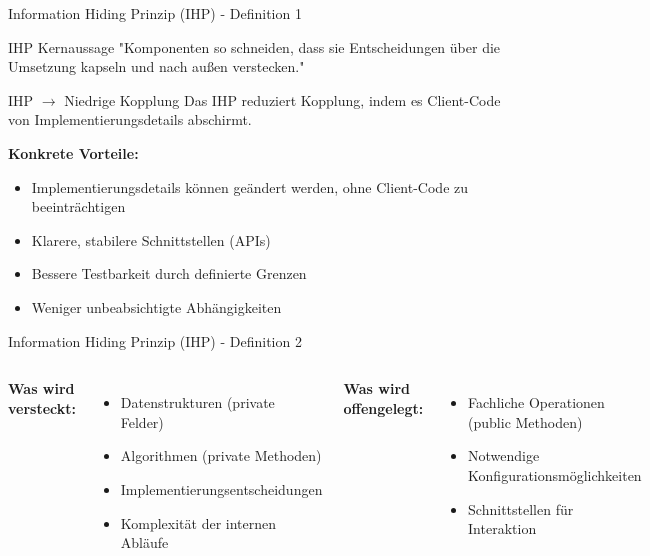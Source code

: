\begin{frame}{Information Hiding Prinzip (IHP) - Definition 1}
  \begin{exampleblock}{IHP Kernaussage}
    "Komponenten so schneiden, dass sie Entscheidungen über die Umsetzung kapseln und nach außen verstecken."
  \end{exampleblock}

  \begin{alertblock}{IHP $\rightarrow$ Niedrige Kopplung}
    Das IHP reduziert Kopplung, indem es Client-Code von Implementierungsdetails abschirmt.
  \end{alertblock}

  \textbf{Konkrete Vorteile:}
  \begin{itemize}
    \item Implementierungsdetails können geändert werden, ohne Client-Code zu beeinträchtigen
    \item Klarere, stabilere Schnittstellen (APIs)
    \item Bessere Testbarkeit durch definierte Grenzen
    \item Weniger unbeabsichtigte Abhängigkeiten
  \end{itemize}
\end{frame}

\begin{frame}{Information Hiding Prinzip (IHP) - Definition 2}
  \begin{columns}[T]
    \textbf{Was wird versteckt:}
    \begin{itemize}
      \item Datenstrukturen (private Felder)
      \item Algorithmen (private Methoden)
      \item Implementierungsentscheidungen
      \item Komplexität der internen Abläufe
    \end{itemize}

    \textbf{Was wird offengelegt:}
    \begin{itemize}
      \item Fachliche Operationen (public Methoden)
      \item Notwendige Konfigurationsmöglichkeiten
      \item Schnittstellen für Interaktion
    \end{itemize}
  \end{columns}
\end{frame}

